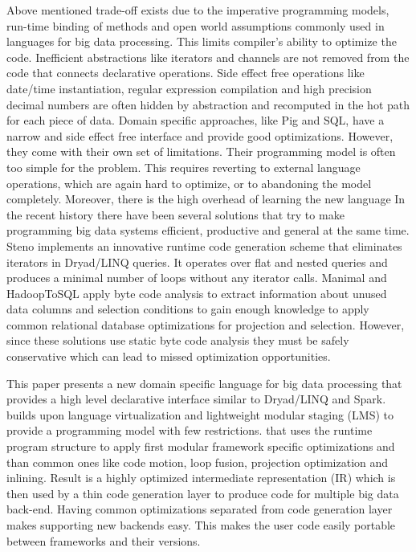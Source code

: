 Above mentioned trade-off exists due to the imperative programming models, run-time binding of methods and open world assumptions commonly used in languages for big data processing. This limits compiler's ability to optimize the code. Inefficient abstractions like iterators and channels are not removed from the code that connects declarative operations. Side effect free operations like date/time instantiation, regular expression compilation and high precision decimal numbers are often hidden by abstraction and recomputed in the hot path for each piece of data. Domain specific approaches, like Pig and SQL, have a narrow and side effect free interface and provide good optimizations. However, they come with their own set of limitations. Their programming model is often too simple for the problem. This requires reverting to external language operations, which are again hard to optimize, or to abandoning the model completely. Moreover, there is the high overhead of learning the new language 
In the recent history there have been several solutions that try to make programming big data systems efficient, productive and general at the same time. Steno \cite{murray_steno:_2011} implements an innovative runtime code generation scheme that eliminates iterators in Dryad/LINQ queries. It operates over flat and nested queries and produces a minimal number of loops without any iterator calls. Manimal \cite{jahani_automatic_2011} and HadoopToSQL \cite{iu_hadooptosql:_2010} apply byte code analysis to extract information about unused data columns and selection conditions to gain enough knowledge to apply common relational database optimizations for projection and selection. However, since these solutions use static byte code analysis they must be safely conservative which can lead to missed optimization opportunities.


This paper presents a new domain specific language \tool for big data processing that provides a high level declarative interface similar to Dryad/LINQ and Spark. \tool builds upon language virtualization \cite{moors_scala-virtualized_2012} and lightweight modular staging \cite{rompf_lightweight_2010} (LMS) to provide  a programming model with few restrictions.  that uses the runtime program structure to apply first modular framework specific optimizations and than common ones like code motion, loop fusion, projection optimization and inlining. Result is a highly optimized intermediate representation (IR) which is then used by a thin code generation layer to produce code for multiple big data back-end. Having common optimizations separated from code generation layer makes supporting new backends  easy. This makes the user code easily portable between frameworks and their versions. 

